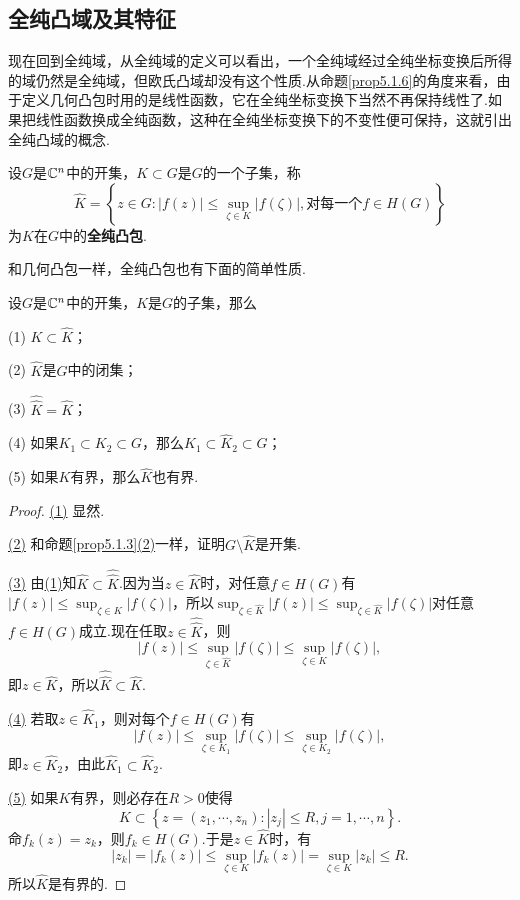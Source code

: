 \subsection{全纯凸域及其特征}
现在回到全纯域，从全纯域的定义可以看出，一个全纯域经过全纯坐标变换后所得的域仍然是全纯域，但欧氏凸域却没有这个性质.从命题\ref{prop5.1.6}的角度来看，由于定义几何凸包时用的是线性函数，它在全纯坐标变换下当然不再保持线性了.如果把线性函数换成全纯函数，这种在全纯坐标变换下的不变性便可保持，这就引出全纯凸域的概念.
\begin{definition}\label{prop5.1.7}
	设$G$是$\mathbb C^n$中的开集，$K\subset G$是$G$的一个子集，称
	\[\widehat{K}=\left\{z\in G\colon|f(z)|\le\sup_{\zeta\in K}|f(\zeta)|,\text{对每一个}f\in H(G)\right\}\]
	为$K$在$G$中的\textbf{全纯凸包}.
\end{definition}
和几何凸包一样，全纯凸包也有下面的简单性质.
\begin{prop}\label{prop5.1.8}
	设$G$是$\mathbb C^n$中的开集，$K$是$G$的子集，那么
	
	(1)\hypertarget{5.1.8}{}
	$K\subset\widehat{K}$；
	
	(2)\hypertarget{5.1.8}{}
	$\widehat{K}$是$G$中的闭集；
	
	(3)\hypertarget{5.1.8}{}
	$\widehat{\widehat{K}}=\widehat{K}$；
	
	(4)\hypertarget{5.1.8}{}
	如果$K_1\subset K_2\subset G$，那么$\widehat{K}_1\subset\widehat{K}_2\subset G$；
	
	(5)\hypertarget{5.1.8}{}
	如果$K$有界，那么$\widehat{K}$也有界.
\end{prop}
\begin{proof}
	\hyperlink{5.1.8}{(1)}
	显然.
	
	\hyperlink{5.1.8}{(2)}
	和命题\ref{prop5.1.3}\hyperlink{5.1.3}{(2)}一样，证明$G\setminus\widehat{K}$是开集.
	
	\hyperlink{5.1.8}{(3)}
	由\hyperlink{5.1.8}{(1)}知$\widehat{K}\subset\widehat{\widehat{K}}$.因为当$z\in\widehat{K}$时，对任意$f\in H(G)$有$|f(z)|\le\sup_{\zeta\in K}|f(\zeta)|$，所以$\sup_{\zeta\in\widehat{K}}|f(z)|\le\sup_{\zeta\in\widehat{K}}|f(\zeta)|$对任意$f\in H(G)$成立.现在任取$z\in\widehat{\widehat{K}}$，则
	\[|f(z)|\le\sup_{\zeta\in\widehat{K}}|f(\zeta)|\le\sup_{\zeta\in K}|f(\zeta)|,\]
	即$z\in\widehat{K}$，所以$\widehat{\widehat{K}}\subset\widehat{K}$.
	
	\hyperlink{5.1.8}{(4)}
	若取$z\in\widehat{K}_1$，则对每个$f\in H(G)$有
	\[|f(z)|\le\sup_{\zeta\in K_1}|f(\zeta)|\le\sup_{\zeta\in K_2}|f(\zeta)|,\]
	即$z\in\widehat{K}_2$，由此$\widehat{K}_1\subset\widehat{K}_2$.
	
	\hyperlink{5.1.8}{(5)}
	如果$K$有界，则必存在$R>0$使得
	\[K\subset\left\{z=(z_1,\cdots,z_n)\colon|z_j|\le R,j=1,\cdots,n\right\}.\]
	命$f_k(z)=z_k$，则$f_k\in H(G)$.于是$z\in\widehat{K}$时，有
	\[|z_k|=|f_k(z)|\le\sup_{\zeta\in K}|f_k(z)|=\sup_{\zeta\in K}|z_k|\le R.\]
	所以$\widehat{K}$是有界的.
\end{proof}
